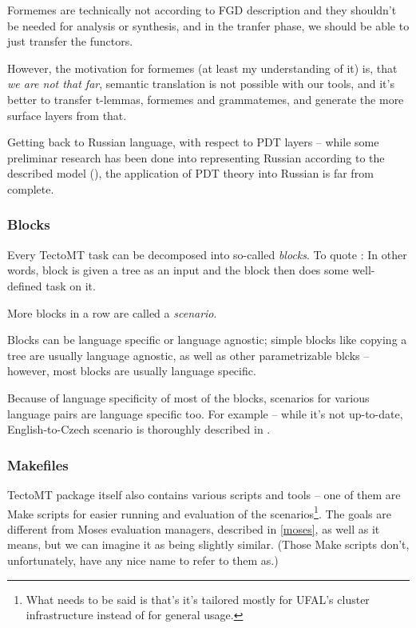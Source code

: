 Formemes are technically not  according to FGD description and they shouldn't be needed for analysis or synthesis, and in the tranfer phase, we should be able to just transfer the functors. 

However, the motivation for formemes (at least my understanding of it) is, that \emph{we are not that far},  semantic translation is not possible with our tools, and it's better to transfer t-lemmas, formemes and grammatemes, and generate the more surface layers from that.

Getting back to Russian language, with respect to PDT layers -- while some preliminar research has been done into representing Russian according to the described model (\cite{syntagrus_pdt}), the application of PDT theory into Russian is far from complete.

\subsubsection{Blocks}

Every TectoMT task can be decomposed into so-called \emph{blocks}. To quote \cite{zabokrtsky_hab}:  In other words, block is given a tree as an input and the block then does some well-defined task on it.

More blocks in a row are called a \emph{scenario}.

Blocks can be language specific or language agnostic; simple blocks like copying a tree are usually language agnostic, as well as other parametrizable blcks -- however, most blocks are usually language specific.

Because of language specificity of most of the blocks, scenarios for various language pairs are language specific too. For example -- while it's not up-to-date, English-to-Czech scenario is thoroughly described in \cite{zabokrtsky_hab}.

\subsubsection{Makefiles}

TectoMT package itself also contains various scripts and tools -- one of them are Make scripts for easier running and evaluation of the scenarios\footnote{What needs to be said is that's it's tailored mostly for UFAL's cluster infrastructure instead of for general usage.}. The goals are different from Moses evaluation managers, described in \ref{moses}, as well as it means, but we can imagine it as being slightly similar. (Those Make scripts don't, unfortunately, have any nice name to refer to them as.)

